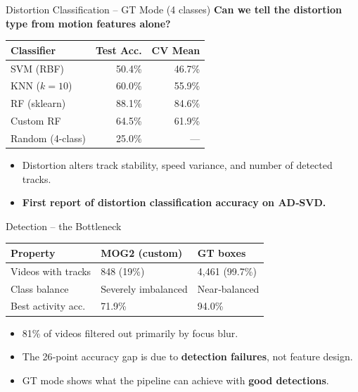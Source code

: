 \documentclass[compress,aspectratio=169]{beamer}
\begin{document}
\begin{frame}{Distortion Classification – GT Mode (4 classes)}
  \small
  \textbf{Can we tell the distortion type from motion features alone?}
  \vspace{0.1cm}
  \begin{tabular}{lrr}
    \toprule
    Classifier & Test Acc. & CV Mean \\
    \midrule
    SVM (RBF)          & 50.4\% & 46.7\% \\
    KNN ($k=10$)       & 60.0\% & 55.9\% \\
    \alert{RF (sklearn)}  & \alert{88.1\%} & 84.6\% \\
    Custom RF          & 64.5\% & 61.9\% \\
    \midrule
    Random (4-class)   & 25.0\% & --- \\
    \bottomrule
  \end{tabular}
  \vspace{0.3cm}
  \begin{itemize}
    \item Distortion alters track stability, speed variance, and number of detected tracks.
    \item \textbf{First report of distortion classification accuracy on AD‑SVD.}
  \end{itemize}
\end{frame}

\begin{frame}{Detection – the Bottleneck}
  \centering
  \small
  \begin{tabular}{lll}
    \toprule
    Property & MOG2 (custom) & GT boxes \\
    \midrule
    Videos with tracks   & 848 (19\%)   & 4,461 (99.7\%) \\
    Class balance        & Severely imbalanced & Near‑balanced \\
    Best activity acc.   & 71.9\%       & \alert{94.0\%} \\
    \bottomrule
  \end{tabular}
  \vspace{0.4cm}
  \begin{itemize}
    \item \alert{81\% of videos filtered out} primarily by focus blur.
    \item The 26‑point accuracy gap is due to \textbf{detection failures}, not feature design.
    \item GT mode shows what the pipeline can achieve with \textbf{good detections}.
  \end{itemize}
\end{frame}
\end{document}

